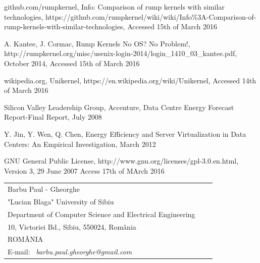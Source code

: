 \documentclass[10pt,a4paper,twoside]{article}
\begin{document}
\begin{thebibliography}{*}\label{Refences}
github.com/rumpkernel, \newblock Info: Comparison of rump kernels with similar technologies,
\newblock https://github.com/rumpkernel/wiki/wiki/Info\%3A-Comparison-of-rump-kernels-with-similar-technologies,
\newblock Accessed 15th of March 2016

\vspace{-7pt}
A. Kantee, J. Cormac, \newblock Rump Kernels No OS? No Problem!,
\newblock http://rumpkernel.org/misc/usenix-login-2014/login\_1410\_03\_kantee.pdf,
\newblock October 2014,
\newblock Accessed 15th of March 2016

\vspace{-7pt}
wikipedia.org, \newblock Unikernel,
\newblock https://en.wikipedia.org/wiki/Unikernel,
\newblock Accessed 14th of March 2016

\vspace{-7pt}
Silicon Valley Leadership Group, Accenture, \newblock
Data Centre Energy Forecast Report-Final Report, \newblock July 2008

\vspace{-7pt}
Y. Jin, Y. Wen, Q. Chen,
\newblock Energy Efficiency and Server Virtualization in Data Centers: An Empirical Investigation,
\newblock March 2012

GNU General Public License, \newblock http://www.gnu.org/licenses/gpl-3.0.en.html,
\newblock Version 3, 29 June 2007
\newblock Access 17th of MArch 2016

\end{thebibliography}

\vspace*{1cm} {\footnotesize
\begin{tabular*}{16cm}{p{4.2cm}p{4.2cm}p{4.2cm}}
Barbu Paul - Gheorghe & \\
"Lucian Blaga" University of Sibiu & \\
Department of Computer Science and Electrical Engineering & \\
10, Victoriei Bd., Sibiu, 550024, Rom\^ania & \\
ROM\^ANIA & \\
E-mail: \ {\it barbu.paul.gheorghe@gmail.com}&
\end{tabular*}}
\end{document}
